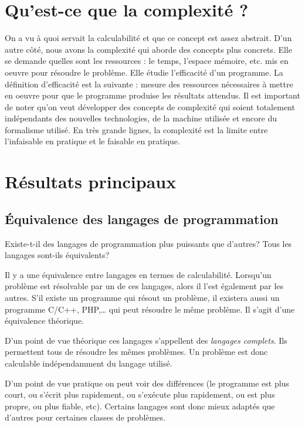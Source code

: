 \section{Qu'est-ce que la complexité ?}
On a vu à quoi servait la calculabilité et que ce concept est assez abstrait. D'un autre côté, nous avons la complexité qui aborde des concepts plus concrets. Elle se demande quelles sont les ressources : le temps, l'espace mémoire, etc. mis en oeuvre pour résoudre le problème.
Elle étudie l'efficacité d'un programme. La définition d'efficacité est la suivante : mesure des ressources nécessaires à mettre en oeuvre pour que le programme produise les résultats attendus.
Il est important de noter qu'on veut développer des concepts de complexité qui soient totalement indépendants des nouvelles technologies, de la machine utilisée et encore du formalisme utilisé.
En très grande lignes, la complexité est la limite entre l'infaisable en pratique et le faisable en pratique. 


\section{Résultats principaux}
\label{sec:r_sultat_principaux}

\subsection{Équivalence des langages de programmation}
\label{subsec:equivalence_des_langages_de_programmation}

Existe-t-il des langages de programmation plus puissants que d'autres? Tous les langages sont-ils équivalents?

Il y a une équivalence entre langages en termes de calculabilité.  Lorsqu'un problème est résolvable par un de ces langages, alors il l'est également par les autres.
S'il existe un programme \java qui résout un problème, il existera aussi un programme C/C++, PHP,\ldots{} qui peut résoudre le même problème. Il s'agit d'une équivalence théorique.

D'un point de vue théorique ces langages s'appellent des \emph{langages complets}. Ils permettent tous de résoudre les mêmes problèmes. Un problème est donc calculable indépendamment du langage utilisé.

D'un point de vue pratique on peut voir des différences (le programme est plus court, ou s'écrit plus rapidement, ou s'exécute plus rapidement, ou est plus propre, ou plus fiable, etc). Certains langages sont donc mieux adaptés que d'autres pour certaines classes de problèmes.


